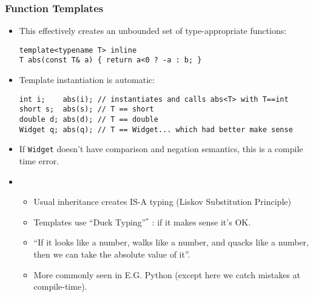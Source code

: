\begin{frame}[fragile,t]
\frametitle{Function Templates}
\begin{itemize}[<+->]
\item This effectively creates an unbounded set of type-appropriate functions:
{\scriptsize
\begin{verbatim}
template<typename T> inline
T abs(const T& a) { return a<0 ? -a : b; }
\end{verbatim}
}
\vskip 6pt
\item Template instantiation is automatic:
{\scriptsize
\begin{verbatim}
int i;    abs(i); // instantiates and calls abs<T> with T==int
short s;  abs(s); // T == short
double d; abs(d); // T == double
Widget q; abs(q); // T == Widget... which had better make sense
\end{verbatim}
}
\vskip 6pt
\item If \texttt{Widget} doesn't have comparison and negation
semantics, this is a compile time error.
\vskip 6pt
\item {}
\begin{itemize}
  \item Usual \CC inheritance creates IS-A typing (Liskov Substitution
    Principle)
  \item Templates use ``Duck Typing''$^*$ : if it makes sense
     it's OK.
  \item ``If it looks like a number, walks like a number, and quacks
    like a number, then we can take the absolute value of it''.
  \item More commonly seen in E.G. Python (except here we catch
    mistakes at compile-time).
\end{itemize}
\end{itemize}
\pause
\begin{center}
{\scriptsize{}
}
\end{center}
\end{frame}


